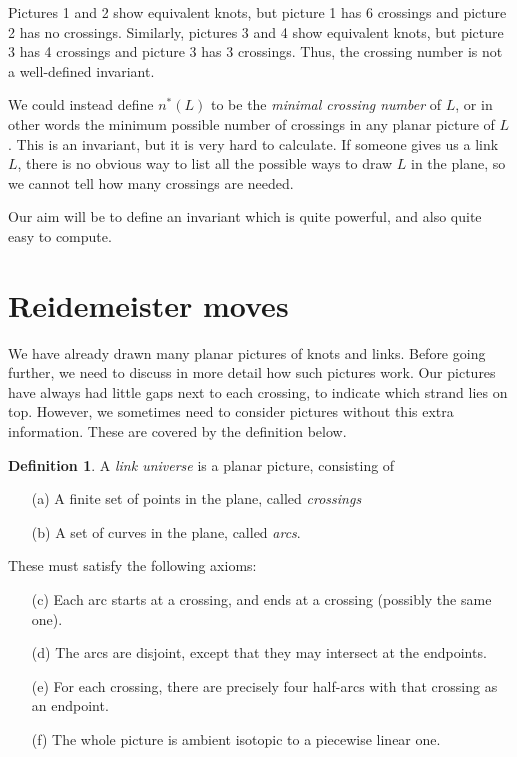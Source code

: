 \documentclass[reqno]{amsart}
\theoremstyle{definition}
\newtheorem{definition}[theorem]{Definition}
\begin{document}
Pictures 1 and 2 show equivalent knots, but picture 1 has 6 crossings
and picture 2 has no crossings.  Similarly, pictures 3 and 4 show
equivalent knots, but picture 3 has 4 crossings and picture 3 has 3
crossings.  Thus, the crossing number is not a well-defined invariant.

We could instead define $n^*(L)$ to be the \emph{minimal crossing
 number} of $L$, or in other words the minimum possible number of
crossings in any planar picture of $L$.  This is an invariant, but it
is very hard to calculate.  If someone gives us a link $L$, there is
no obvious way to list all the possible ways to draw $L$ in the plane,
so we cannot tell how many crossings are needed.

Our aim will be to define an invariant which is quite powerful, and
also quite easy to compute.  

\section{Reidemeister moves}
\label{sec-reidemeister}

We have already drawn many planar pictures of knots and links.  Before
going further, we need to discuss in more detail how such pictures
work.  Our pictures have always had little gaps next to each crossing,
to indicate which strand lies on top.  However, we sometimes need to
consider pictures without this extra information.  These are covered
by the definition below.

\begin{definition}
 A \emph{link universe} is a planar picture, consisting of 
 \begin{itemize}
  \item[(a)] A finite set of points in the plane, called
   \emph{crossings}
  \item[(b)] A set of curves in the plane, called \emph{arcs}.
 \end{itemize}
 These must satisfy the following axioms:
 \begin{itemize}
  \item[(c)] Each arc starts at a crossing, and ends at a crossing
   (possibly the same one).
  \item[(d)] The arcs are disjoint, except that they may intersect at
   the endpoints.
  \item[(e)] For each crossing, there are precisely four half-arcs with
   that crossing as an endpoint.
  \item[(f)] The whole picture is ambient isotopic to a piecewise
   linear one.
 \end{itemize}
\end{definition}
\end{document}
